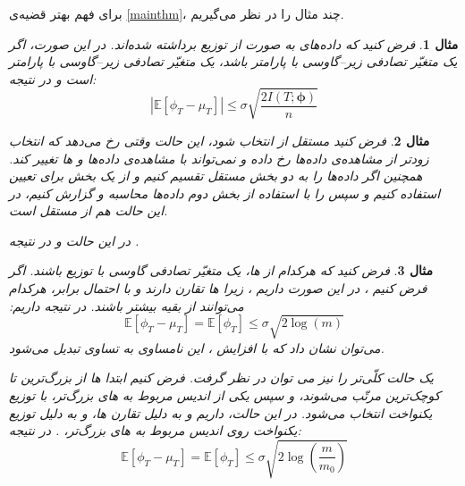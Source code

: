 \documentclass[a4paper,12pt]{article}
\newtheorem{exa}{{\large\bf مثال}}[section]
\newcommand{\E}{\mathbb{E}}
\newcommand{\bfphi}{\bm {\phi}}
\newcommand{\Nd}{\mathcal{N}}
\begin{document}
	برای فهم بهتر قضیه‌ی
	\eqref{mainthm}،
	چند مثال را در نظر می‌گیریم.
	\begin{exa}
		فرض کنید
		که داده‌های
		به صورت
		از توزیع
		برداشته شده‌اند. در این صورت، اگر
		\lr{$f_i(X_j)-\E[f_i(X_j)]$}
		یک متغیّر تصادفی زیر--گاوسی با پارامتر
		\lr{$\sigma$}
		باشد،
		یک متغیّر تصادفی زیر--گاوسی با پارامتر
		است و در نتیجه:
		\begin{equation}
		|\E[\phi_T-\mu_T]|\leq \sigma \sqrt{\frac{2I(T;\bfphi)}{n}}
		\end{equation}
	\end{exa}
	\begin{exa}
		فرض کنید
		مستقل از 
		\lr{$\bfphi$}
		انتخاب شود، این حالت وقتی رخ می‌دهد که انتخاب
		زودتر از مشاهده‌ی داده‌ها رخ داده و نمی‌تواند با مشاهده‌ی داده‌ها و 
		ها
		تغییر کند. همچنین اگر داده‌ها را به دو بخش مستقل تقسیم کنیم و از یک بخش برای تعیین
		استفاده کنیم و سپس 
		را با استفاده از بخش دوم داده‌ها محاسبه و گزارش کنیم، در این حالت هم
		از
		\lr{$\bfphi$}
		مستقل است.
		
		در این حالت
		\lr{$I(T;\bfphi)=0$}
		و در نتیجه
		\lr{$\E[\phi_T] = \E[\mu_T]$}.
	\end{exa}
	\begin{exa}
		فرض کنید که هرکدام از
		ها،
		یک متغیّر تصادفی گاوسی با توزیع
		\lr{$\Nd(0,\sigma^2)$}
		باشند. اگر فرض کنیم
		،
		در این صورت داریم
		\lr{$I(T;\bfphi) = H(T) = \log(m)$}،
		زیرا 
		ها
		تقارن دارند و با احتمال برابر، هرکدام می‌توانند از بقیه بیشتر باشند. در نتیجه داریم:
		\begin{equation}
		\E[\phi_T-\mu_T] = \E[\phi_T] \leq \sigma\sqrt{2\log(m)}
		\end{equation}
		می‌توان نشان داد که با افزایش
		،
		این نامساوی به تساوی تبدیل می‌شود.
		
		یک حالت کلّی‌تر را نیز می توان در نظر گرفت. فرض کنیم ابتدا 
		ها
		از بزرگ‌ترین تا کوچک‌ترین مرتّب می‌شوند، و سپس یکی از 
		اندیس مربوط به
		های 
		بزرگ‌تر، با توزیع یکنواخت انتخاب می‌شود. در این حالت، داریم
		\lr{$I(T;\bfphi) = H(T)-H(T|\bfphi)$}
		و به دلیل تقارن
		ها،
		و به دلیل توزیع یکنواخت
		روی
		اندیس مربوط به
		های
		بزرگ‌تر، 
		\lr{$H(T|\bfphi) = \log(m_0)$}.
		در نتیجه:
		\begin{equation}
		\E[\phi_T-\mu_T] = \E[\phi_T] \leq \sigma\sqrt{2\log(\frac{m}{m_0})}
		\end{equation}
	\end{exa}
	
\end{document}
